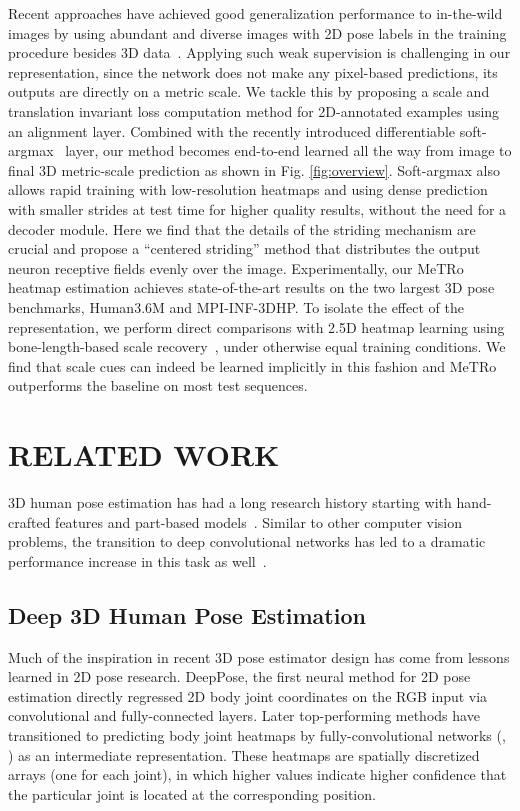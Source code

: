 Recent approaches have achieved good generalization performance to in-the-wild images by using abundant and diverse images with 2D pose labels in the training procedure besides 3D data~\cite{Zhou17ICCV,Sun18ECCV,Luvizon18CVPR}.
Applying such weak supervision is challenging in our representation, since the network does not make any pixel-based predictions, its outputs are directly on a metric scale.
We tackle this by proposing a scale and translation invariant loss computation method for 2D-annotated examples using an alignment layer.
Combined with the recently introduced differentiable soft-argmax~\cite{Levine16JMLR,Luvizon17Arxiv,Sun18ECCV,Nibali18arXiv} layer, our method becomes end-to-end learned all the way from image to final 3D metric-scale prediction as shown in Fig. \ref{fig:overview}. Soft-argmax also allows rapid training with low-resolution heatmaps and using dense prediction with smaller strides at test time for higher quality results, without the need for a decoder module. Here we find that the details of the striding mechanism are crucial and propose a ``centered striding'' method that distributes the output neuron receptive fields evenly over the image.
Experimentally, our MeTRo heatmap estimation achieves state-of-the-art results on the two largest 3D pose benchmarks, Human3.6M and MPI-INF-3DHP.
To isolate the effect of the representation, we perform direct comparisons with 2.5D heatmap learning using bone-length-based scale recovery~\cite{Pavlakos17CVPR}, under otherwise equal training conditions.
We find that scale cues can indeed be learned implicitly in this fashion and MeTRo outperforms the baseline on most test sequences.

\section{\uppercase{Related Work}}
\label{sec:related}
3D human pose estimation has had a long research history starting with hand-crafted features and part-based models~\cite{Sarafianos16CVIU}. Similar to other computer vision problems, the transition to deep convolutional networks has led to a dramatic performance increase in this task as well~\cite{Tome17CVPR,Mehta17TDV,Mehta17TOG,Sun17ICCV,Martinez17ICCV,Mehta18TDV,Sun18ECCV}.

\subsection{Deep 3D Human Pose Estimation}
Much of the inspiration in recent 3D pose estimator design has come from lessons learned in 2D pose research.
DeepPose, the first neural method for 2D pose estimation \cite{Toshev14CVPR} directly regressed 2D body joint coordinates on the RGB input via convolutional and fully-connected layers.
Later top-performing methods have transitioned to predicting body joint heatmaps by fully-convolutional networks (\eg, \cite{Newell16ECCV}) as an intermediate representation.
These heatmaps are spatially discretized arrays (one for each joint), in which higher values indicate higher confidence that the particular joint is located at the corresponding position.

